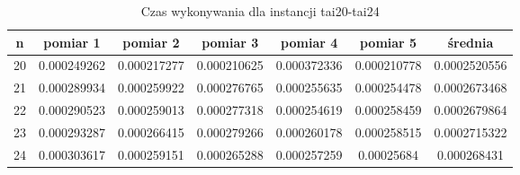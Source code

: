 \documentclass[a4paper,11pt]{article}
\begin{document}
\begin{table}
\begin{center}
\begin{tabular}{ | c | c | c | c | c | c | c | }
\hline
n & pomiar 1 & pomiar 2 & pomiar 3 & pomiar 4 & pomiar 5 & średnia \\ \hline
20 & 0.000249262 & 0.000217277 & 0.000210625 & 0.000372336 & 0.000210778 & 0.0002520556 \\ \hline
21 & 0.000289934 & 0.000259922 & 0.000276765 & 0.000255635 & 0.000254478 & 0.0002673468 \\ \hline
22 & 0.000290523 & 0.000259013 & 0.000277318 & 0.000254619 & 0.000258459 & 0.0002679864 \\ \hline
23 & 0.000293287 & 0.000266415 & 0.000279266 & 0.000260178 & 0.000258515 & 0.0002715322 \\ \hline
24 & 0.000303617 & 0.000259151 & 0.000265288 & 0.000257259 & 0.00025684 & 0.000268431 \\ \hline
\end{tabular}
\caption{Czas wykonywania dla instancji tai20-tai24}
\end{center}
\end{table}
\end{document}
